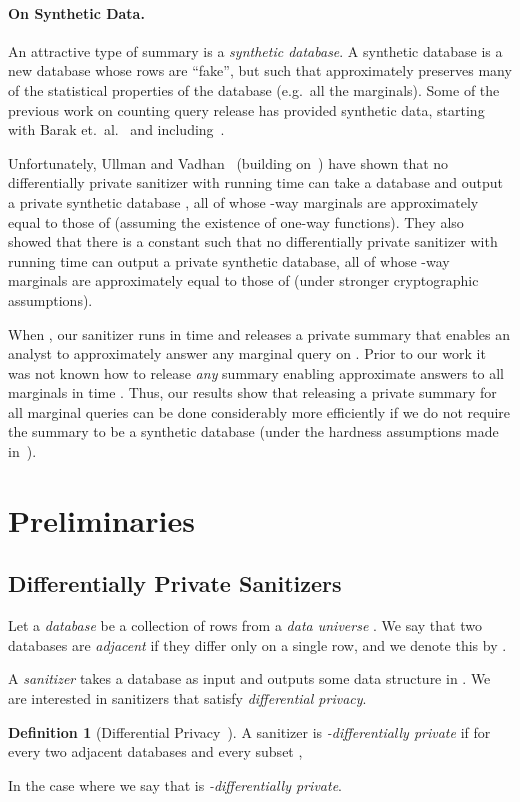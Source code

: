 \documentclass[11pt]{article}
\theoremstyle{definition}
\newtheorem{definition}[theorem]{Definition}
\begin{document}
\paragraph{On Synthetic Data.} An attractive type of summary is a \emph{synthetic database}.  A synthetic database is a new database  whose rows are ``fake'', but such that  approximately preserves many of the statistical properties of the database  (e.g.~all the marginals).  Some of the previous work on counting query release has provided synthetic data, starting with Barak et.~al.~\cite{BarakChDwKaMcTa07} and including~\cite{BlumLiRo08,DworkNaReRoVa09,DworkRoVa10,HardtLiMc10}.

Unfortunately, Ullman and Vadhan~\cite{UllmanVa11} (building on~\cite{DworkNaReRoVa09}) have shown that no differentially private sanitizer with running time  can take a database  and output a private synthetic database , all of whose -way marginals are approximately equal to those of  (assuming the existence of one-way functions).  They also showed that there is a constant  such that no differentially private sanitizer with running time  can output a private synthetic database, all of whose -way marginals are approximately equal to those of  (under stronger cryptographic assumptions).

When , our sanitizer runs in time  and releases a private summary that enables an analyst to approximately answer any marginal query on .  Prior to our work it was not known how to release \emph{any} summary enabling approximate answers to all marginals in time .  Thus, our results show that releasing a private summary for all marginal queries can be done considerably more efficiently if we do not require the summary to be a synthetic database (under the hardness assumptions made in~\cite{UllmanVa11}).
\section{Preliminaries}

\subsection{Differentially Private Sanitizers}\label{sec:sans}

Let a \emph{database}  be a collection of  rows  from a \emph{data universe} .  We say that two databases  are \emph{adjacent} if they differ only on a single row, and we denote this by .

A \emph{sanitizer}  takes a database as input and outputs some data structure in .  We are interested in sanitizers that satisfy \emph{differential privacy}.
\begin{definition}[Differential Privacy~\cite{DworkMcNiSm06}]\label{def:dp} A sanitizer  is \emph{-differentially private} if for every two adjacent databases  and every subset ,

In the case where  we say that  is \emph{-differentially private}.
\end{definition}
\end{document}
